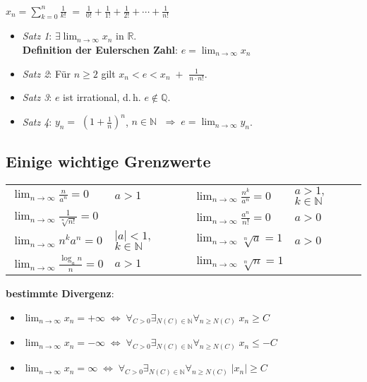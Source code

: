{\large $x_n = \sum_{k=0}^{n} \frac{1}{k!} \;=\; \frac{1}{0!} + \frac{1}{1!} +
\frac{1}{2!} + \cdots + \frac{1}{n!}$}

\begin{itemize}
    \item \emph{Satz 1}: $\exists \lim_{n \to \infty} x_n$
    in $\mathbb{R}$. \\
    \textbf{Definition der Eulerschen Zahl}: $e = \lim_{n \to \infty} x_n$
    
    \item \emph{Satz 2}: Für $n \ge 2$ gilt
    $x_n < e < x_n \;+ $ {\large $\frac{1}{n \cdot n!}$}.
    
    \item \emph{Satz 3}: $e$ ist irrational, d.\,h. $e \notin \mathbb{Q}$.
    
    \item \emph{Satz 4}: $y_n =$ {\large $(1 + \frac{1}{n})^n$},
    $n \in \mathbb{N}$  $\;\Rightarrow\; e = \lim_{n \to \infty} y_n$.
\end{itemize}

\subsection{%
    Einige wichtige Grenzwerte%
}

{\large
\begin{tabular}{p{3.8cm}p{3.8cm}p{3.8cm}p{3.8cm}}
    $\lim_{n \to \infty} \frac{n}{a^n} = 0$ & $a > 1$ &
    $\lim_{n \to \infty} \frac{n^k}{a^n} = 0$ & $a > 1,$ $k \in \mathbb{N}$ \\
    $\lim_{n \to \infty} \frac{1}{\sqrt[n]{n!}} = 0$ & &
    $\lim_{n \to \infty} \frac{a^n}{n!} = 0$ & $a > 0$ \\
    $\lim_{n \to \infty} n^k a^n = 0$ & $|a| < 1,$ $k \in \mathbb{N}$ &
    $\lim_{n \to \infty} \sqrt[n]{a} = 1$ & $a > 0$ \\
    $\lim_{n \to \infty} \frac{\log_a{n}}{n} = 0$ & $a > 1$ &
    $\lim_{n \to \infty} \sqrt[n]{n} = 1$
\end{tabular}
}

\vspace{3mm}
\linie

\textbf{bestimmte Divergenz}:

\begin{itemize}
    \item $\lim_{n \to \infty} x_n = +\infty \;\Leftrightarrow\;
    \forall_{C > 0} \exists_{N(C) \in \mathbb{N}} \forall_{n \ge N(C)}\;
    x_n \ge C$
    
    \item $\lim_{n \to \infty} x_n = -\infty \;\Leftrightarrow\;
    \forall_{C > 0} \exists_{N(C) \in \mathbb{N}} \forall_{n \ge N(C)}\;
    x_n \le -C$
    
    \item $\lim_{n \to \infty} x_n = \infty \;\Leftrightarrow\;
    \forall_{C > 0} \exists_{N(C) \in \mathbb{N}} \forall_{n \ge N(C)}\;
    |x_n| \ge C$
\end{itemize}

